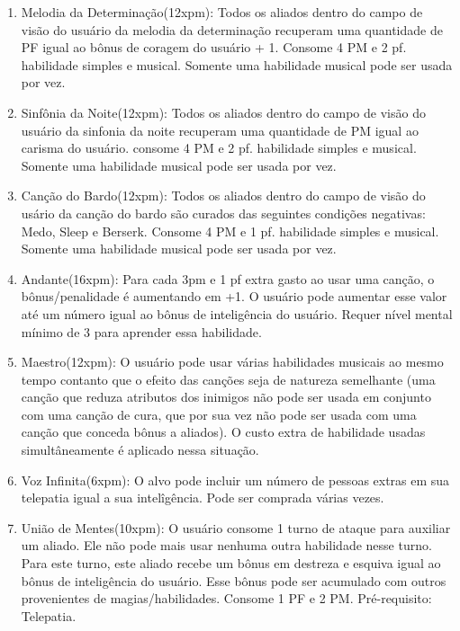 \begin{enumerate}
		\item Melodia da Determinação(12xpm): Todos os aliados dentro do campo de visão do usuário da melodia da determinação recuperam uma quantidade de PF igual ao bônus de coragem do usuário + 1. Consome 4 PM e 2 pf. habilidade simples e musical. Somente uma habilidade musical pode ser usada por vez.
		
		\item Sinfônia da Noite(12xpm): Todos os aliados dentro do campo de visão do usuário da sinfonia da noite recuperam uma quantidade de PM igual ao carisma do usuário. consome 4 PM e 2 pf. habilidade simples e musical. Somente uma habilidade musical pode ser usada por vez.
			
		\item Canção do Bardo(12xpm): Todos os aliados dentro do campo de visão do usário da canção do bardo são curados das seguintes condições negativas: Medo, Sleep e Berserk. Consome 4 PM e 1 pf. habilidade simples e musical. Somente uma habilidade musical pode ser usada por vez.	
		
		\item Andante(16xpm): Para cada 3pm e 1 pf extra gasto ao usar uma canção, o bônus/penalidade é aumentando em +1. O usuário pode aumentar esse valor até um número igual ao bônus de inteligência do usuário. Requer nível mental mínimo de 3 para aprender essa habilidade.
				
		\item Maestro(12xpm): O usuário pode usar várias habilidades musicais ao mesmo tempo contanto que o efeito das canções seja de natureza semelhante (uma canção que reduza atributos dos inimigos não pode ser usada em conjunto com uma canção de cura, que por sua vez não pode ser usada com uma canção que conceda bônus a aliados). O custo extra de habilidade usadas simultâneamente é aplicado nessa situação.		 
		 
		\item Voz Infinita(6xpm): O alvo pode incluir um número de pessoas extras em sua telepatia igual a sua intelîgência. Pode ser comprada várias vezes.
		
		\item União de Mentes(10xpm): O usuário consome 1 turno de ataque para auxiliar um aliado. Ele não pode mais usar nenhuma outra habilidade nesse turno. Para este turno, este aliado recebe um bônus em destreza e esquiva igual ao bônus de inteligência do usuário. Esse bônus pode ser acumulado com outros provenientes de magias/habilidades. Consome 1 PF e 2 PM. Pré-requisito: Telepatia.
	

\end{enumerate}
